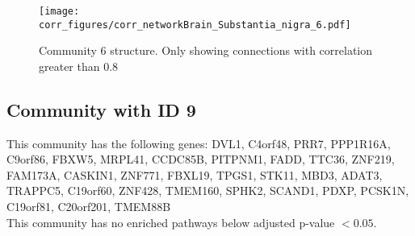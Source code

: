 \begin{figure}[h!]
\centering
\texttt{[image: corr\_figures/corr\_networkBrain\_Substantia\_nigra\_6.pdf]}
\caption{Community 6 structure. Only showing connections with correlation greater than 0.8}
\end{figure}




\subsection*{Community with ID 9}
This community has the following genes: DVL1, C4orf48, PRR7, PPP1R16A, C9orf86, FBXW5, MRPL41, CCDC85B, PITPNM1, FADD, TTC36, ZNF219, FAM173A, CASKIN1, ZNF771, FBXL19, TPGS1, STK11, MBD3, ADAT3, TRAPPC5, C19orf60, ZNF428, TMEM160, SPHK2, SCAND1, PDXP, PCSK1N, C19orf81, C20orf201, TMEM88B
\\
This community has no enriched pathways below adjusted p-value $< 0.05$.

